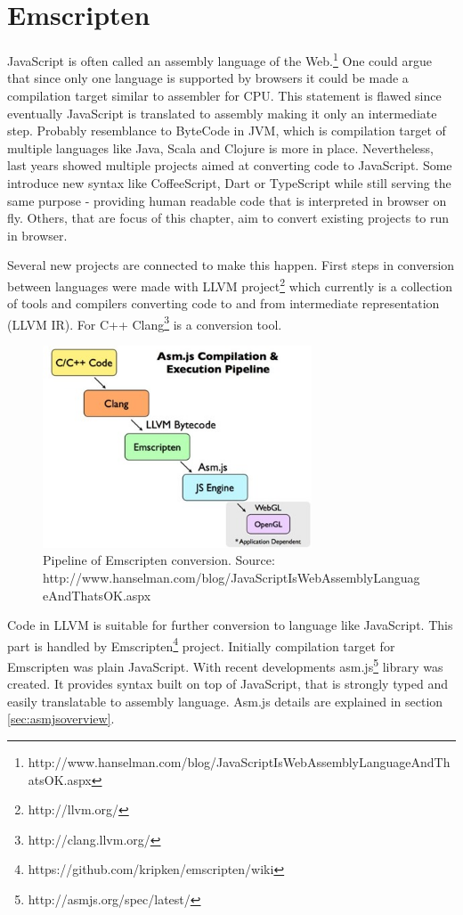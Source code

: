 \chapter{Emscripten}
\label{cha:emscripten}

JavaScript is often called an assembly language of the Web.\footnote{http://www.hanselman.com/blog/JavaScriptIsWebAssemblyLanguageAndThatsOK.aspx} One could argue that since only one language is supported by browsers it could be made a compilation target similar to assembler for CPU. This statement is flawed since eventually JavaScript is translated to assembly making it only an intermediate step. Probably resemblance to ByteCode in JVM, which is compilation target of multiple languages like Java, Scala and Clojure is more in place.
Nevertheless, last years showed multiple projects aimed at converting code to JavaScript. Some introduce new syntax like CoffeeScript, Dart or TypeScript while still serving the same purpose - providing human readable code that is interpreted in browser on fly. Others, that are focus of this chapter, aim to convert existing projects to run in browser.

Several new projects are connected to make this happen. First steps in conversion between languages were made with LLVM project\footnote{http://llvm.org/} which currently is a collection of tools and compilers converting code to and from intermediate representation (LLVM IR). For C++ Clang\footnote{http://clang.llvm.org/} is a conversion tool.

\begin{figure}[h!]
  \caption{Pipeline of Emscripten conversion. Source: http://www.hanselman.com/blog/JavaScriptIsWebAssemblyLanguageAndThatsOK.aspx}
  \label{img:emscriptenpipeline}
  \centering
	\includegraphics[width=8cm]{emscripten/pipeline.jpg}
\end{figure}

Code in LLVM is suitable for further conversion to language like JavaScript. This part is handled by Emscripten\footnote{https://github.com/kripken/emscripten/wiki} project. Initially compilation target for Emscripten was plain JavaScript. With recent developments asm.js\footnote{http://asmjs.org/spec/latest/} library was created. It provides syntax built on top of JavaScript, that is strongly typed and easily translatable to assembly language. Asm.js details are explained in section \ref{sec:asmjsoverview}.

